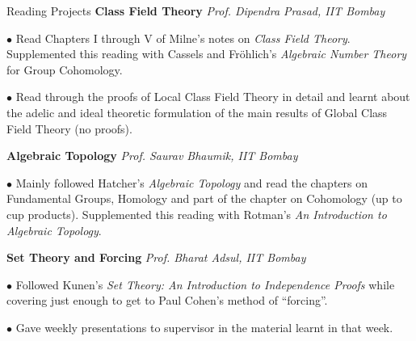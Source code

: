 \begin{rubric}{Reading Projects}
	\entry*[2024\phantom{}] \textbf{Class Field Theory} \hfill \emph{Prof. Dipendra Prasad, IIT Bombay}

	$\bullet$ Read Chapters I through V of Milne's notes on \emph{Class Field Theory}. Supplemented this reading with Cassels and Fr\"ohlich's \emph{Algebraic Number Theory} for Group Cohomology.

	$\bullet$ Read through the proofs of Local Class Field Theory in detail and learnt about the adelic and ideal theoretic formulation of the main results of Global Class Field Theory (no proofs).


	\entry*[2023\phantom{}] \textbf{Algebraic Topology} \hfill \emph{Prof. Saurav Bhaumik, IIT Bombay}

	$\bullet$ Mainly followed Hatcher's \emph{Algebraic Topology} and read the chapters on Fundamental Groups, Homology and part of the chapter on Cohomology (up to cup products). Supplemented this reading with Rotman's \emph{An Introduction to Algebraic Topology}.


	\entry*[2023\phantom{}] \textbf{Set Theory and Forcing} \hfill \emph{Prof. Bharat Adsul, IIT Bombay}

	$\bullet$ Followed Kunen's \emph{Set Theory: An Introduction to Independence Proofs} while covering just enough to get to Paul Cohen's method of ``forcing''.

	$\bullet$ Gave weekly presentations to supervisor in the material learnt in that week.
\end{rubric}